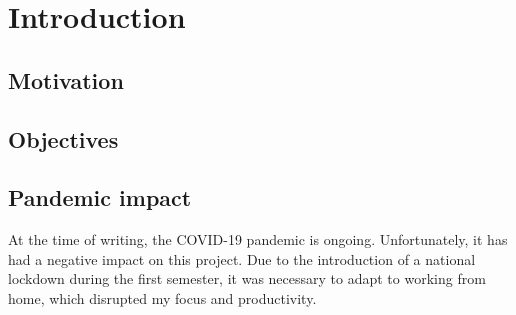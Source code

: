 \documentclass[../../report.tex]{subfiles}
\begin{document}
\chapter{Introduction}

\section{Motivation}
\section{Objectives}
\section{Pandemic impact}
At the time of writing, the COVID-19 pandemic is ongoing. Unfortunately, it has had a negative impact on this project. Due to the introduction of a national lockdown during the first semester, it was necessary to adapt to working from home, which disrupted my focus and productivity.
\end{document}
